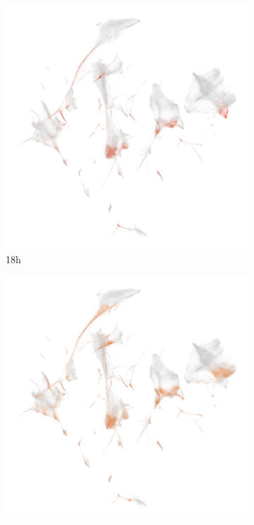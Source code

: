 \documentclass[runningheads]{llncs}
\begin{document}
\begin{figure}[H]
  \centering
  \begin{subfigure}[b]{0.3\textwidth}
    \centering
    \includegraphics[height=0.18\textheight]{fig_umap_18h_optimized.png}
    \caption{18h}
    \label{fig:umap_18h}
  \end{subfigure}
  \hfill
  \begin{subfigure}[b]{0.3\textwidth}
    \centering
    \includegraphics[height=0.18\textheight]{fig_umap_24h_optimized.png}

\end{subfigure}
\end{figure}
\end{document}
